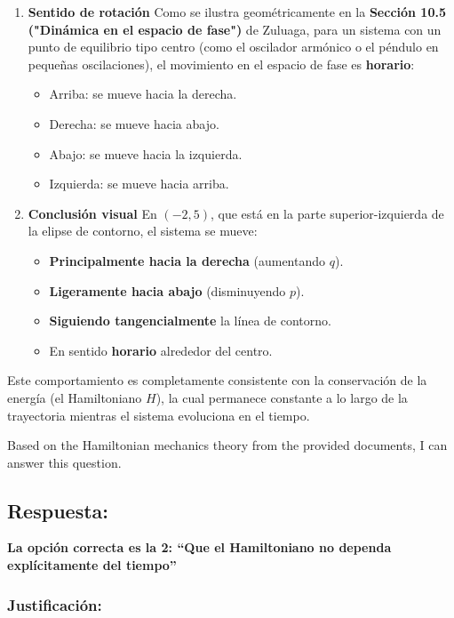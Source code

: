 \documentclass[a4paper]{article}
\begin{document}
\begin{enumerate}
    \item \textbf{Sentido de rotación}
    Como se ilustra geométricamente en la \textbf{Sección 10.5 ("Dinámica en el espacio de fase")} de Zuluaga, para un sistema con un punto de equilibrio tipo centro (como el oscilador armónico o el péndulo en pequeñas oscilaciones), el movimiento en el espacio de fase es \textbf{horario}:
    \begin{itemize}
        \item Arriba: se mueve hacia la derecha.
        \item Derecha: se mueve hacia abajo.
        \item Abajo: se mueve hacia la izquierda.
        \item Izquierda: se mueve hacia arriba.
    \end{itemize}

    \item \textbf{Conclusión visual}
    En $(-2, 5)$, que está en la parte superior-izquierda de la elipse de contorno, el sistema se mueve:
    \begin{itemize}
        \item \textbf{Principalmente hacia la derecha} (aumentando $q$).
        \item \textbf{Ligeramente hacia abajo} (disminuyendo $p$).
        \item \textbf{Siguiendo tangencialmente} la línea de contorno.
        \item En sentido \textbf{horario} alrededor del centro.
    \end{itemize}
\end{enumerate}

Este comportamiento es completamente consistente con la conservación de la energía (el Hamiltoniano $H$), la cual permanece constante a lo largo de la trayectoria mientras el sistema evoluciona en el tiempo.


Based on the Hamiltonian mechanics theory from the provided documents, I can answer this question.

\subsection*{Respuesta:}

\textbf{La opción correcta es la 2: ``Que el Hamiltoniano no dependa explícitamente del tiempo''}

\subsubsection*{Justificación:}
\end{document}
